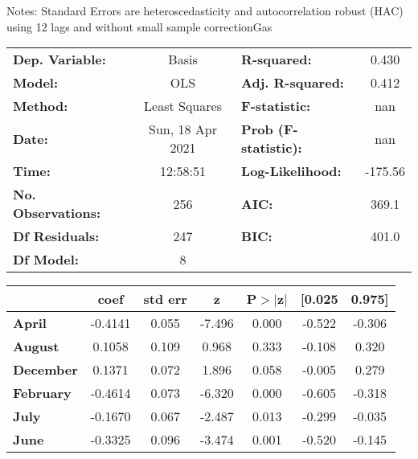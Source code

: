 Notes: \newline
 [1] Standard Errors are heteroscedasticity and autocorrelation robust (HAC) using 12 lags and without small sample correctionGas\begin{center}
\begin{tabular}{lclc}
\toprule
\textbf{Dep. Variable:}    &      Basis       & \textbf{  R-squared:         } &     0.430   \\
\textbf{Model:}            &       OLS        & \textbf{  Adj. R-squared:    } &     0.412   \\
\textbf{Method:}           &  Least Squares   & \textbf{  F-statistic:       } &       nan   \\
\textbf{Date:}             & Sun, 18 Apr 2021 & \textbf{  Prob (F-statistic):} &      nan    \\
\textbf{Time:}             &     12:58:51     & \textbf{  Log-Likelihood:    } &   -175.56   \\
\textbf{No. Observations:} &         256      & \textbf{  AIC:               } &     369.1   \\
\textbf{Df Residuals:}     &         247      & \textbf{  BIC:               } &     401.0   \\
\textbf{Df Model:}         &           8      & \textbf{                     } &             \\
\bottomrule
\end{tabular}
\begin{tabular}{lcccccc}
                  & \textbf{coef} & \textbf{std err} & \textbf{z} & \textbf{P$> |$z$|$} & \textbf{[0.025} & \textbf{0.975]}  \\
\midrule
\textbf{April}    &      -0.4141  &        0.055     &    -7.496  &         0.000        &       -0.522    &       -0.306     \\
\textbf{August}   &       0.1058  &        0.109     &     0.968  &         0.333        &       -0.108    &        0.320     \\
\textbf{December} &       0.1371  &        0.072     &     1.896  &         0.058        &       -0.005    &        0.279     \\
\textbf{February} &      -0.4614  &        0.073     &    -6.320  &         0.000        &       -0.605    &       -0.318     \\
\textbf{July}     &      -0.1670  &        0.067     &    -2.487  &         0.013        &       -0.299    &       -0.035     \\
\textbf{June}     &      -0.3325  &        0.096     &    -3.474  &         0.001        &       -0.520    &       -0.145     \\

\end{tabular}
\end{center}
